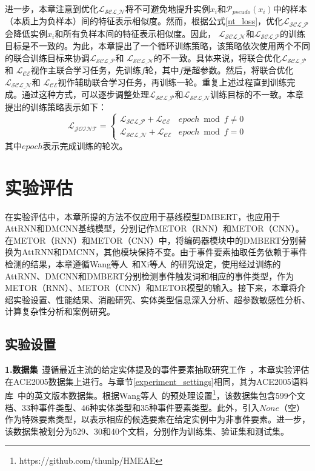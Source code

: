 进一步，本章注意到优化$\mathcal{L_\textrm{SCL\_N}}$将不可避免地提升实例$x_{i}$和$\mathcal{P}_{pseudo}\left(x_{i}\right)$中的样本（本质上为负样本）间的特征表示相似度。然而，根据公式\ref{nt_loss}，优化$\mathcal{L_\textrm{SCL\_P}}$会降低实例$x_{i}$和所有负样本间的特征表示相似度。因此， $\mathcal{L_\textrm{SCL\_N}}$和$\mathcal{L_\textrm{SCL\_P}}$的训练目标是不一致的。为此，本章提出了一个循环训练策略，该策略依次使用两个不同的联合训练目标来协调$\mathcal{L_\textrm{SCL\_P}}$和 $\mathcal{L_\textrm{SCL\_N}}$的不一致。具体来说，将联合优化$\mathcal{L_\textrm{SCL\_P}}$和 $\mathcal{L_\textrm{CE}}$视作主联合学习任务，先训练$f$轮，其中$f$是超参数。然后，将联合优化$\mathcal{L_\textrm{SCL\_N}}$和 $\mathcal{L_\textrm{CE}}$视作辅助联合学习任务，再训练一轮。重复上述过程直到训练完成。通过这种方式，可以逐步调整处理$\mathcal{L_\textrm{SCL\_P}}$和$\mathcal{L_\textrm{SCL\_N}}$训练目标的不一致。本章提出的训练策略表示如下：
\begin{equation}
\label{eq24}
\mathcal{L_\textrm{JOINT}}=\left\{\begin{array}{lr}
 \mathcal{L_\textrm{SCL\_P}}+\mathcal{L_\textrm{CE}} & epoch \bmod f \neq 0 \\
 \mathcal{L_\textrm{SCL\_N}}+\mathcal{L_\textrm{CE}} & epoch \bmod f = 0 
\end{array}\right.
\end{equation}
其中$epoch$表示完成训练的轮次。

\section{实验评估}
\label{evaluation_section}
在实验评估中，本章所提的方法不仅应用于基线模型DMBERT，也应用于AttRNN和DMCNN基线模型，分别记作METOR（RNN）和METOR（CNN）。在METOR（RNN）和METOR（CNN）中，将编码器模块中的DMBERT分别替换为AttRNN和DMCNN，其他模块保持不变。由于事件要素抽取任务依赖于事件检测的结果，本章遵循Wang等人~\cite{wang2019hmeae}和Xi等人~\cite{xiangyu2021capturing}的研究设定，使用经过训练的AttRNN、DMCNN和DMBERT分别检测事件触发词和相应的事件类型，作为METOR（RNN）、METOR（CNN）和METOR模型的输入。接下来，本章将介绍实验设置、性能结果、消融研究、实体类型信息深入分析、超参数敏感性分析、计算复杂性分析和案例研究。

\subsection{实验设置}
\label{settings_4}
\textbf{1.数据集}~遵循最近主流的给定实体提及的事件要素抽取研究工作~\cite{xiangyu2021capturing,liu2018jointly, nguyen2016joint}，本章实验评估在ACE2005数据集上进行。与章节\ref{experiment_settings}相同，其为ACE2005语料库~\cite{doddington2004automatic}中的英文版本数据集。根据Wang等人~\cite{wang2019hmeae}的预处理设置\footnote{https://github.com/thunlp/HMEAE}，该数据集包含599个文档、33种事件类型、46种实体类型和35种事件要素类型。此外，引入$None$（空）作为特殊要素类型，以表示相应的候选要素在给定实例中为非事件要素。进一步，该数据集被划分为529、30和40个文档，分别作为训练集、验证集和测试集。

